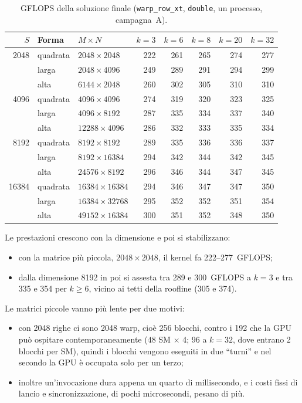 \documentclass[11pt,a4paper]{article}
\begin{document}
\begin{table}[H]
  \centering
  \caption{GFLOPS della soluzione finale (\texttt{warp\_row\_xt},
    \texttt{double}, un processo, campagna~A).}\label{tab:ris-finale}
  \begin{tabular}{rllrrrrr}
    \toprule
    $S$ & Forma & $M \times N$ & $k=3$ & $k=6$ & $k=8$ & $k=20$ & $k=32$ \\
    \midrule
    2048  & quadrata & $2048 \times 2048$   & 222 & 261 & 265 & 274 & 277 \\
          & larga    & $2048 \times 4096$   & 249 & 289 & 291 & 294 & 299 \\
          & alta     & $6144 \times 2048$   & 260 & 302 & 305 & 310 & 310 \\
    \midrule
    4096  & quadrata & $4096 \times 4096$   & 274 & 319 & 320 & 323 & 325 \\
          & larga    & $4096 \times 8192$   & 287 & 335 & 334 & 337 & 340 \\
          & alta     & $12288 \times 4096$  & 286 & 332 & 333 & 335 & 334 \\
    \midrule
    8192  & quadrata & $8192 \times 8192$   & 289 & 335 & 336 & 336 & 337 \\
          & larga    & $8192 \times 16384$  & 294 & 342 & 344 & 342 & 345 \\
          & alta     & $24576 \times 8192$  & 296 & 346 & 344 & 347 & 345 \\
    \midrule
    16384 & quadrata & $16384 \times 16384$ & 294 & 346 & 347 & 347 & 350 \\
          & larga    & $16384 \times 32768$ & 295 & 352 & 352 & 351 & 354 \\
          & alta     & $49152 \times 16384$ & 300 & 351 & 352 & 348 & 350 \\
    \bottomrule
  \end{tabular}
\end{table}

Le prestazioni crescono con la dimensione e poi si stabilizzano:
\begin{itemize}
  \item con la matrice più piccola, $2048 \times 2048$, il kernel fa
        222--277~GFLOPS;
  \item dalla dimensione 8192 in poi si assesta tra 289 e 300~GFLOPS a $k = 3$
        e tra 335 e 354 per $k \ge 6$, vicino ai tetti della roofline (305 e
        374).
\end{itemize}

Le matrici piccole vanno più lente per due motivi:
\begin{itemize}
  \item con 2048 righe ci sono 2048 warp, cioè 256 blocchi, contro i 192
        che la GPU può ospitare contemporaneamente ($48$ SM $\times$ 4; 96 a
        $k = 32$, dove entrano 2 blocchi per SM), quindi
        i blocchi vengono eseguiti in due ``turni'' e nel secondo la GPU è
        occupata solo per un terzo;
  \item inoltre un'invocazione dura appena un quarto di millisecondo, e i costi
        fissi di lancio e sincronizzazione, di pochi microsecondi, pesano di più.
\end{itemize}
\end{document}
